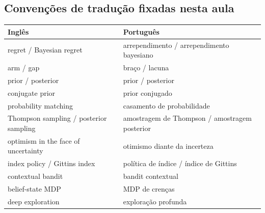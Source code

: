 \documentclass[11pt, a4paper]{article}
\begin{document}
\subsection*{Convenções de tradução fixadas nesta aula}

\begin{center}\small
\begin{tabular}{@{}ll@{}}
\toprule
\textbf{Inglês} & \textbf{Português} \\
\midrule
regret / Bayesian regret & arrependimento / arrependimento bayesiano \\
arm / gap & braço / lacuna \\
prior / posterior & prior / posterior \\
conjugate prior & prior conjugado \\
probability matching & casamento de probabilidade \\
Thompson sampling / posterior sampling & amostragem de Thompson / amostragem posterior \\
optimism in the face of uncertainty & otimismo diante da incerteza \\
index policy / Gittins index & política de índice / índice de Gittins \\
contextual bandit & bandit contextual \\
belief-state MDP & MDP de crenças \\
deep exploration & exploração profunda \\
\bottomrule
\end{tabular}
\end{center}

\medskip
{}
\end{document}
